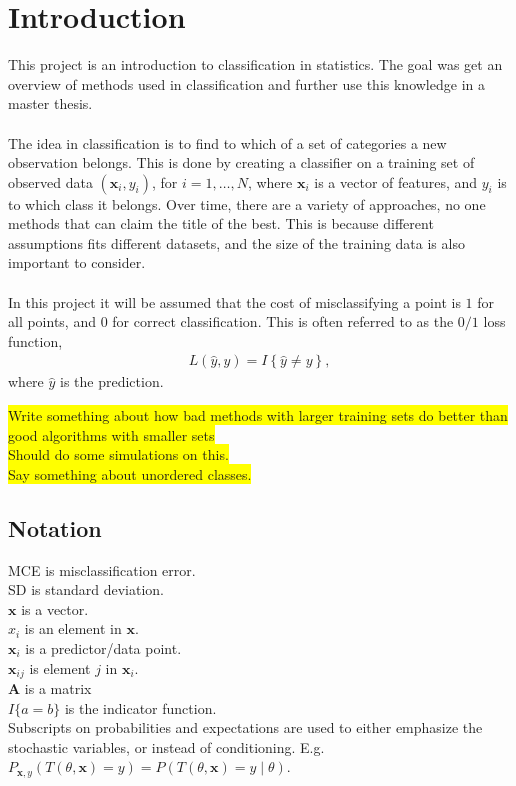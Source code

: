 \section{Introduction}
\label{sec:Introduction}
This project is an introduction to classification in statistics. The goal was get an overview of methods used in classification and further use this knowledge in a master thesis. \\
\\
The idea in classification is to find to which of a set of categories a new observation belongs. This is done by creating a classifier on a training set of observed data $(\mathbf{x}_i, y_i)$, for $i = 1, \ldots, N$, where $\mathbf{x}_i$ is a vector of features, and $y_i$ is to which class it belongs. Over time, there are a variety of approaches, no one methods that can claim the title of the best. This is because different assumptions fits different datasets, and the size of the training data is also important to consider. \\
\\
In this project it will be assumed that the cost of misclassifying a point is $1$ for all points, and $0$ for correct classification. This is often referred to as the $0/1$ loss function, 
\begin{align}
  L(\hat y, y) = I\left\{ \hat y \neq y \right\},
\end{align}
where $\hat y$ is the prediction.

\colorbox{yellow}{Write something about how bad methods with larger training sets do better than good algorithms with smaller sets}\\
\colorbox{yellow}{Should do some simulations on this.}\\
\colorbox{yellow}{Say something about unordered classes.}


\subsection{Notation}
\label{sub:Notation}
MCE is misclassification error. \\
SD is standard deviation. \\
$\mathbf{x}$ is a vector. \\
$x_i$ is an element in $\mathbf{x}$. \\
$\mathbf{x}_i$ is a predictor/data point.  \\
$\mathbf{x}_{ij}$ is element $j$ in $\mathbf{x}_i$. \\
$\mathbf{A}$ is a matrix \\
$I\{a = b\}$ is the indicator function.\\
Subscripts on probabilities and expectations are used to either emphasize the stochastic variables, or instead of conditioning. 
E.g. $P_{\mathbf{x}, y}(T(\theta, \mathbf{x}) = y) = P(T(\theta, \mathbf{x}) = y \mid \theta)$.

